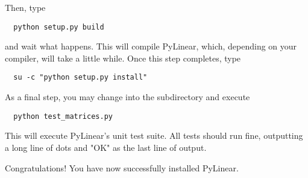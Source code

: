 Then, type
\begin{verbatim}
  python setup.py build
\end{verbatim}
and wait what happens. This will compile PyLinear, which, depending on
your compiler, will take a little while. Once this step completes, type
\begin{verbatim}
  su -c "python setup.py install"
\end{verbatim}

As a final step, you may change into the  subdirectory
and execute
\begin{verbatim}
  python test_matrices.py
\end{verbatim}
This will execute PyLinear's unit test suite. All tests should
run fine, outputting a long line of dots and "OK" as the last line
of output.

Congratulations! You have now successfully installed PyLinear.
